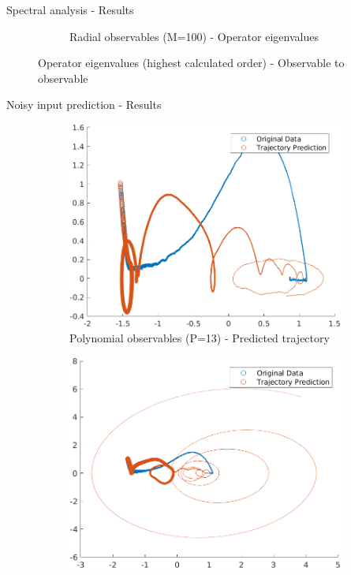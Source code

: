 \documentclass{beamer}
\begin{document}
\begin{frame}{Spectral analysis - Results}
\begin{figure}
\begin{subfigure}[b]{0.45\textwidth}
            \caption{Radial observables (M=100) - Operator eigenvalues}
            \label{fig:eigen_radial}
        \end{subfigure}
        \caption{Operator eigenvalues (highest calculated order) - Observable to observable}
    \end{figure}
\end{frame}

\begin{frame}{Noisy input prediction - Results}
    \begin{figure}
        \centering
        \begin{subfigure}[b]{0.45\textwidth}
            \centering
            \includegraphics[width=\textwidth]{Training_Poly.png}
            \caption{Polynomial observables (P=13) - Predicted trajectory}
            \label{fig:training_poly}
        \end{subfigure}
        \hfill
        \begin{subfigure}[b]{0.45\textwidth}
            \centering
            \includegraphics[width=\textwidth]{Training_Radial.png}

\end{subfigure}
\end{figure}
\end{frame}
\end{document}
